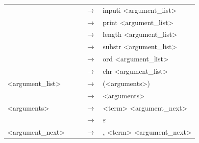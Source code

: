 \documentclass[a4paper, 11pt]{article}
\begin{document}
\begin{table}[!ht]
\begin{tabular}{lllll}
                                        &  &  & $\rightarrow$ & inputi \textless{}argument\_list\textgreater{}                                                                                   \\
                                        &  &  & $\rightarrow$ & print \textless{}argument\_list\textgreater{}                                                                                    \\
                                        &  &  & $\rightarrow$ & length \textless{}argument\_list\textgreater{}                                                                                   \\
                                        &  &  & $\rightarrow$ & substr \textless{}argument\_list\textgreater{}                                                                                   \\
                                        &  &  & $\rightarrow$ & ord \textless{}argument\_list\textgreater{}                                                                                      \\
                                        &  &  & $\rightarrow$ & chr \textless{}argument\_list\textgreater{}                                                                                      \\
\textless{}argument\_list\textgreater{} &  &  & $\rightarrow$ & (\textless{}arguments\textgreater{})                                                                                             \\
                                        &  &  & $\rightarrow$ & \textless{}arguments\textgreater{}                                                                                               \\
\textless{}arguments\textgreater{}      &  &  & $\rightarrow$ & \textless{}term\textgreater{} \textless{}argument\_next\textgreater{}                                                              \\
                                        &  &  & $\rightarrow$ & $\varepsilon$                                                                                                                    \\
\textless{}argument\_next\textgreater{} &  &  & $\rightarrow$ & , \textless{}term\textgreater{} \textless{}argument\_next\textgreater{}                                                            \\

\end{tabular}
\end{table}
\end{document}
